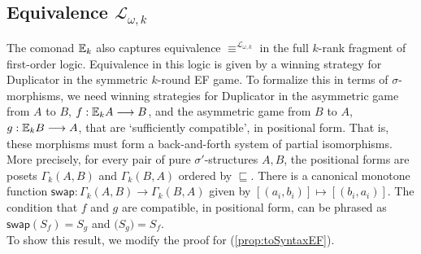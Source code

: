 \subsection{Equivalence $\mathcal{L}_{\omega,k}$}
The comonad ${\mathbb{E}_{k}}$ also captures equivalence $\equiv^{\mathcal{L}_{\omega,k}}$ in the full $k$-rank fragment of first-order logic. Equivalence in this logic is given by a winning strategy for Duplicator in the symmetric $k$-round EF game. To formalize this in terms of $\sigma$-morphisms, we need winning strategies for Duplicator in the asymmetric game from $A$ to $B$, $f:{\mathbb{E}_{k}A} \longrightarrow B$, and the asymmetric game from $B$ to $A$, $g:{\mathbb{E}_{k}B} \longrightarrow A$, that are `sufficiently compatible', in positional form.  That is, these morphisms must form a back-and-forth system of partial isomorphisms. More precisely, for every pair of pure $\sigma'$-structures $A,B$, the positional forms are posets $\Gamma_{k}(A,B)$ and $\Gamma_{k}(B,A)$ ordered by $\sqsubseteq$. There is a canonical monotone function $\mathsf{swap}:\Gamma_{k}(A,B) \longrightarrow \Gamma_{k}(B,A)$ given by $[(a_{i},b_{i})] \longmapsto [(b_{i},a_{i})]$. The condition that $f$ and $g$ are compatible, in positional form, can be phrased as $\mathsf{swap}(S_{f}) = S_{g}$ and $\mathsf(S_{g}) = S_{f}$. \\ 
To show this result, we modify the proof for (\ref{prop:toSyntaxEF}).  
